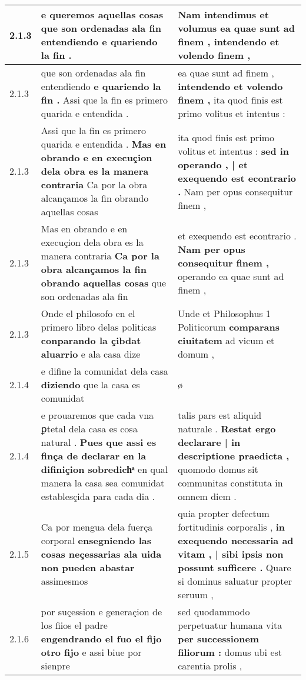 \begin{tabular}{|p{1cm}|p{6.5cm}|p{6.5cm}|}
2.1.3 & e queremos aquellas cosas \textbf{ que son ordenadas ala fin entendiendo } e quariendo la fin . & Nam intendimus et volumus \textbf{ ea quae sunt ad finem , } intendendo et volendo finem , \\\hline
2.1.3 & que son ordenadas ala fin entendiendo \textbf{ e quariendo la fin . } Assi que la fin es primero quarida e entendida . & ea quae sunt ad finem , \textbf{ intendendo et volendo finem , } ita quod finis est primo volitus et intentus : \\\hline
2.1.3 & Assi que la fin es primero quarida e entendida . \textbf{ Mas en obrando e en execuçion dela obra es la manera contraria } Ca por la obra alcançamos la fin obrando aquellas cosas & ita quod finis est primo volitus et intentus : \textbf{ sed in operando , | et exequendo est econtrario . } Nam per opus consequitur finem , \\\hline
2.1.3 & Mas en obrando e en execuçion dela obra es la manera contraria \textbf{ Ca por la obra alcançamos la fin obrando aquellas cosas } que son ordenadas ala fin & et exequendo est econtrario . \textbf{ Nam per opus consequitur finem , } operando ea quae sunt ad finem , \\\hline
2.1.3 & Onde el philosofo en el primero libro delas politicas \textbf{ conparando la çibdat aluarrio } e ala casa dize & Unde et Philosophus 1 Politicorum \textbf{ comparans ciuitatem } ad vicum et domum , \\\hline
2.1.4 & e difine la comunidat dela casa \textbf{ diziendo } que la casa es comunidat & ø \\\hline
2.1.4 & e prouaremos que cada vna ꝑtetal dela casa es cosa natural . \textbf{ Pues que assi es finça de declarar en la difiniçion sobredichͣ } en qual manera la casa sea comunidat establesçida para cada dia . & talis pars est aliquid naturale . \textbf{ Restat ergo declarare | in descriptione praedicta , } quomodo domus sit communitas constituta in omnem diem . \\\hline
2.1.5 & Ca por mengua dela fuerça corporal \textbf{ ensegniendo las cosas neçessarias ala uida non pueden abastar } assimesmos & quia propter defectum fortitudinis corporalis , \textbf{ in exequendo necessaria ad vitam , | sibi ipsis non possunt sufficere . } Quare si dominus saluatur propter seruum , \\\hline
2.1.6 & por suçession e generaçion de los fiios el padre \textbf{ engendrando el fuo el fijo otro fijo } e assi biue por sienpre & sed quodammodo perpetuatur humana vita \textbf{ per successionem filiorum : } domus ubi est carentia prolis , \\\hline

\end{tabular}
